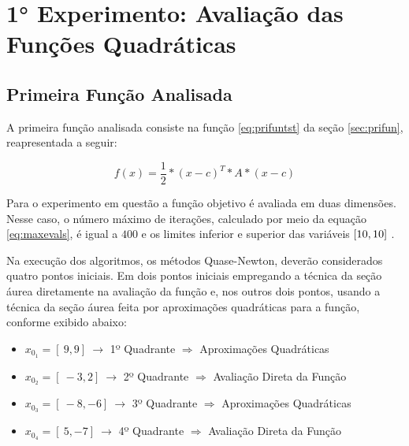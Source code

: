 


\section{1° Experimento: Avaliação das Funções Quadráticas}
    \subsection{Primeira Função Analisada}

    A primeira função analisada consiste na função \ref{eq:prifuntst} da seção \ref{sec:prifun}, reapresentada a seguir:

    \begin{equation*} 
        f(x)= \frac{1}{2}*(x-c)^{T}*A*(x-c)
    \end{equation*}

    Para o experimento em questão a função objetivo é avaliada em duas dimensões. Nesse caso, o número máximo de iterações, calculado por meio da equação \ref{eq:maxevals}, é igual a $400$ e os limites inferior e superior das variáveis $[\-10, 10 ]\ $.

    Na execução dos algoritmos, os métodos Quase-Newton, deverão considerados quatro pontos iniciais. Em dois pontos iniciais empregando a técnica da seção áurea diretamente na avaliação da função e, nos outros dois pontos, usando  a técnica da seção áurea feita por aproximações quadráticas para a função, conforme exibido abaixo:
    \begin{itemize}
        \item $x_{0_1}=[\ 9 , 9 ]\ \rightarrow$ 1º Quadrante $\Rightarrow$ Aproximações Quadráticas  
        \item $x_{0_2}=[\ -3 , 2 ]\ \rightarrow$ 2º Quadrante $\Rightarrow$ Avaliação Direta da Função
        \item $x_{0_3}=[\ -8 , -6 ]\ \rightarrow$ 3º Quadrante $\Rightarrow$ Aproximações Quadráticas  
        \item $x_{0_4}=[\ 5 , -7 ]\ \rightarrow$ 4º Quadrante $\Rightarrow$ Avaliação Direta da Função
    \end{itemize} 

